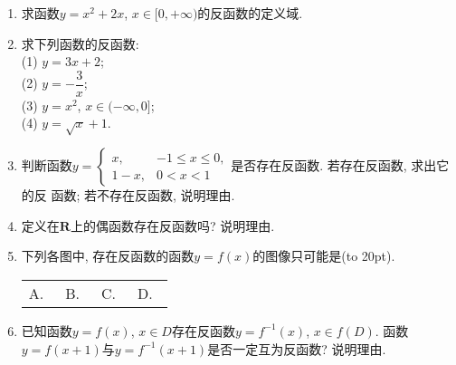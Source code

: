 \documentclass[10pt,a4paper]{article}
\newcommand{\bracket}[1]{(\hbox to #1pt{})}
\newcommand{\fourch}[4]{\par\begin{tabular}{p{.23\textwidth}p{.23\textwidth}p{.23\textwidth}p{.23\textwidth}}
A.~#1 &B.~#2& C.~#3& D.~#4
\end{tabular}}
\begin{document}
\begin{enumerate}[1.]
\item 求函数$y=x^2+2x$, $x\in [0, +\infty)$的反函数的定义域.
\item 求下列函数的反函数:\\
(1) $y=3x+2$;\\
(2) $y=-\dfrac 3x$;\\
(3) $y=x^2$, $x\in (-\infty, 0]$;\\
(4) $y=\sqrt x+1$.
\item 判断函数$y=\begin{cases}x, & -1\le x\le 0, \\ 1-x, & 0<x<1\end{cases}$是否存在反函数. 若存在反函数, 求出它的反
函数; 若不存在反函数, 说明理由. 
\item 定义在$\mathbf{R}$上的偶函数存在反函数吗? 说明理由.
\item 下列各图中, 存在反函数的函数$y=f(x)$的图像只可能是\bracket{20}.
\fourch{\begin{tikzpicture}[>=latex,samples=200,scale =0.7]
\draw [->] (-2,0) -- (0,0) node [below left] {$O$} -- (2,0) node [below right] {$x$};
\draw [->] (0,-0.5) -- (0,2) node [left] {$y$};
\draw [domain=-1.4:1.4] plot (\x, \x * \x);
\end{tikzpicture}}{\begin{tikzpicture}[>=latex,samples=200,scale =0.7]
\draw [->] (-2,0) -- (0,0) node [below left] {$O$} -- (2,0) node [below right] {$x$};
\draw [->] (0,-0.5) -- (0,2) node [left] {$y$};
\draw [domain=-2:-0.2] plot (\x, {-0.4/ \x});
\draw [domain=0.08:2] plot (\x, {0.1/\x+0.75});
\end{tikzpicture}}{\begin{tikzpicture}[>=latex,samples=200,scale =0.7]
\draw [->] (-2,0) -- (0,0) node [below left] {$O$} -- (2,0) node [below right] {$x$};
\draw [->] (0,-0.5) -- (0,2) node [left] {$y$};
\draw [domain=-2:2] plot (\x, {exp(\x)/4});
\end{tikzpicture}}{\begin{tikzpicture}[>=latex,samples=200,scale =0.7]
\draw [->] (-2,0) -- (0,0) node [below left] {$O$} -- (2,0) node [below right] {$x$};
\draw [->] (0,-0.5) -- (0,2) node [left] {$y$};
\draw (-2,2) -- (0,0) -- (2,1);
\end{tikzpicture}}
\item 已知函数$y=f(x)$, $x\in D$存在反函数$y=f^{-1}(x)$, $x\in f(D)$. 函数$y=f(x+1)$与$y=f^{-1}(x+1)$是否一定互为反函数? 说明理由. 

\end{enumerate}
\end{document}
